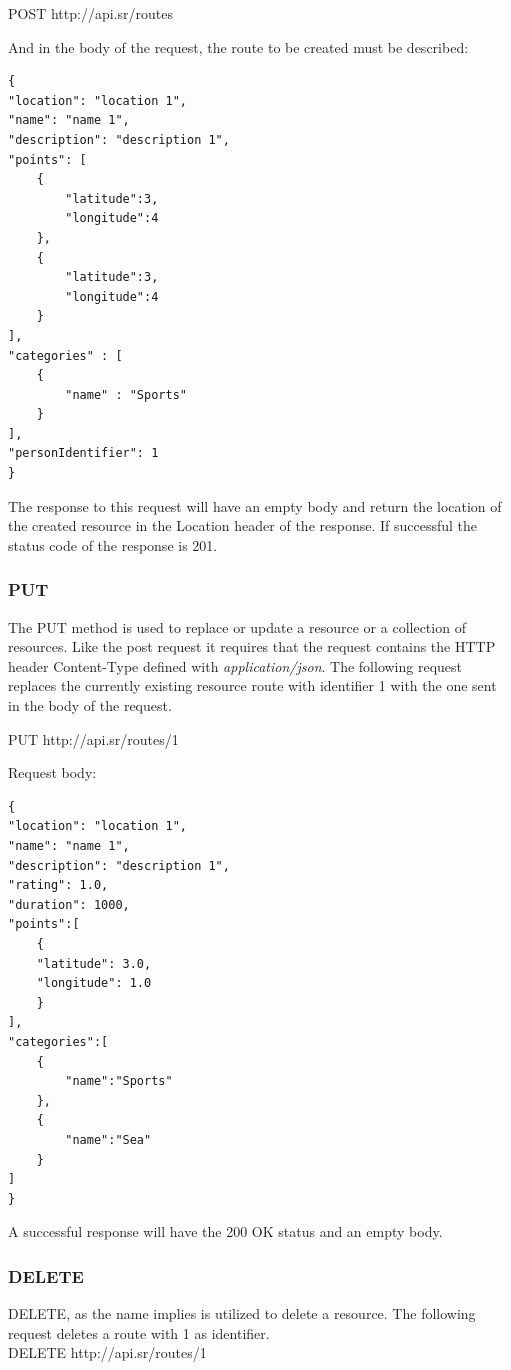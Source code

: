             POST http://api.sr/routes
            
            And in the body of the request, the route to be created must be described:\newline
            \begin{lstlisting}
{
"location": "location 1",
"name": "name 1",
"description": "description 1",
"points": [
    {
        "latitude":3,
        "longitude":4
    },
    {
        "latitude":3,
        "longitude":4
    }
],
"categories" : [
    {
        "name" : "Sports"
    }
],
"personIdentifier": 1
}
            \end{lstlisting}
            
            The response to this request will have an empty body and return the location of the created resource in the Location header of the response. If successful
            the status code of the response is 201.  

        \subsubsection*{PUT}
        The PUT method is used to replace or update a resource or a collection of resources. Like the post request it requires that the
        request contains the HTTP header Content-Type defined with \textit{application/json}.
        The following request replaces the currently existing resource route with identifier 1 with the one sent in the body of the request.

        PUT http://api.sr/routes/1

        Request body:
        \begin{lstlisting}                
{
"location": "location 1",
"name": "name 1",
"description": "description 1",
"rating": 1.0,
"duration": 1000,
"points":[
    {
    "latitude": 3.0,
    "longitude": 1.0
    }
],
"categories":[
    {
        "name":"Sports"
    },
    {
        "name":"Sea"
    }
]
}
        \end{lstlisting}
        A successful response will have the 200 OK status and an empty body.

        \subsubsection*{DELETE}
        DELETE, as the name implies is utilized to delete a resource. The following request deletes a route with 1 as identifier.\\
        DELETE http://api.sr/routes/1

